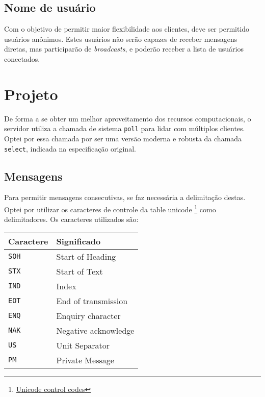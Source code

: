 \documentclass[11pt]{article}
\begin{document}
\subsection{Nome de usuário}
\label{sec:orgaa5fbe6}
Com o objetivo de permitir maior flexibilidade aos clientes, deve ser permitido
usuários anônimos. Estes usuários não serão capazes de receber mensagens diretas, mas
participarão de \emph{broadcasts}, e poderão receber a lista de usuários conectados.
\section{Projeto}
\label{sec:orgf629313}
De forma a se obter um melhor aproveitamento dos recursos computacionais, o servidor
utiliza a chamada de sistema \texttt{poll} para lidar com múltiplos clientes. Optei por essa
chamada por ser uma versão moderna e robusta da chamada \texttt{select}, indicada na
especificação original.
\subsection{Mensagens}
\label{sec:orgf3bd14f}
Para permitir mensagens consecutivas, se faz necessária a delimitação destas. Optei
por utilizar os caracteres de controle da table unicode \footnote{\href{https://en.wikipedia.org/wiki/List\_of\_Unicode\_characters\#Control\_codes}{Unicode control codes}}
como delimitadores. Os caracteres utilizados são:
\begin{center}
\begin{tabular}{ll}
Caractere & Significado\\
\hline
\texttt{SOH} & Start of Heading\\
\texttt{STX} & Start of Text\\
\texttt{IND} & Index\\
\texttt{EOT} & End of transmission\\
\texttt{ENQ} & Enquiry character\\
\texttt{NAK} & Negative acknowledge\\
\texttt{US} & Unit Separator\\
\texttt{PM} & Private Message\\
\end{tabular}
\end{center}
\end{document}
